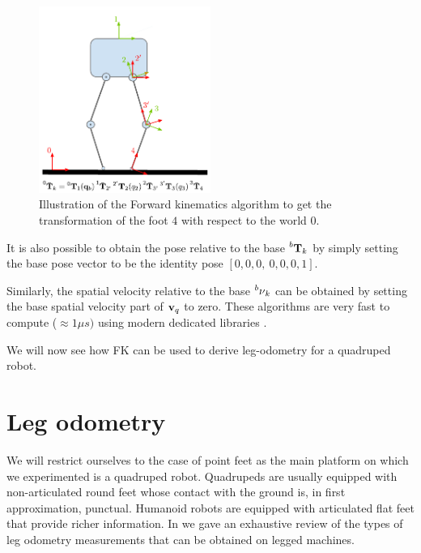 \begin{figure}
    \centering
    \includegraphics[width=0.5\textwidth]{figures/kinematic_tree_FK.pdf}
    \caption{Illustration of the Forward kinematics algorithm to get the transformation of the foot $4$ with respect to the world $0$.}
    \label{fig:forward_kinematics}
\end{figure}


It is also possible to obtain the pose relative to the base $\prescript{b}{}{{\bf T}}_{k}$ by simply setting the base pose vector to be the identity pose $[0,0,0,~0,0,0,1]$.



Similarly, the spatial velocity relative to the base $\prescript{b}{}{\mathbf{\nu}}_k$ can be obtained by setting the base spatial velocity part of ${\bf v}_q$ to zero.
These algorithms are very fast to compute ($\approx 1\mu s)$ using modern dedicated libraries \cite{carpentier2019pinocchio}.

We will now see how FK can be used to derive leg-odometry for a quadruped robot.

\section{Leg odometry}
\label{sec:leg_odometry}
We will restrict ourselves to the case of point feet as the main platform on which we experimented is a quadruped robot.
Quadrupeds are usually equipped with non-articulated round feet whose contact with the ground is, in first approximation, punctual.
Humanoid robots are equipped with articulated flat feet that provide richer information. In  we gave an exhaustive review of the types of leg 
odometry measurements that can be obtained on legged machines.

